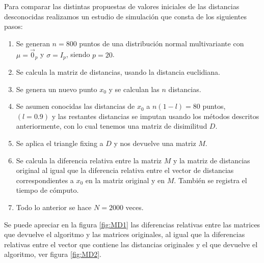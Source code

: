 \documentclass[12pt]{report} %
\theoremstyle{definition}
\begin{document}
{\noindent Para comparar las distintas propuestas de valores iniciales de las distancias desconocidas realizamos un estudio de simulación que consta de los siguientes pasos:
\begin{enumerate}
	\item Se generan $n = 800$ puntos de una distribución normal multivariante con $\mu = \vec{0}_p$ y $\sigma = I_p$, siendo $p=20$.
	\item Se calcula la matriz de distancias, usando la distancia euclidiana.
	\item Se genera un nuevo punto $x_0$ y se calculan las $n$ distancias.
	\item Se asumen conocidas las distancias de $x_0$ a $n(1-l) = 80$ puntos, $(l=0.9)$ y las restantes distancias se imputan usando los métodos descritos anteriormente, con lo cual tenemos una matriz de disimilitud $D$.
	\item Se aplica el triangle fixing a $D$ y nos devuelve una matriz $M$.
	\item Se calcula la diferencia relativa entre la matriz $M$ y la matriz de distancias original al igual que la diferencia relativa entre el vector de distancias correspondientes a $x_0$ en la matriz original y en $M$. También se registra el tiempo de cómputo.
	\item Todo lo anterior se hace $N = 2000$ veces.
\end{enumerate}

Se puede apreciar en la figura \ref{fig:MD1} las diferencias relativas entre las matrices que devuelve el algoritmo y las matrices originales, al igual que la diferencias relativas entre el vector que contiene las distancias originales y el que devuelve el algoritmo, ver figura \ref{fig:MD2}.

}
\end{document}
